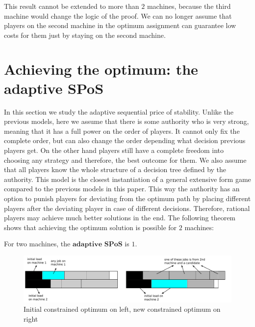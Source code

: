 \documentclass[runningheads]{llncs}
\newcommand{\aSPoS}{\textbf{adaptive SPoS}\xspace}
\begin{document}
\begin{remark} 
This result cannot be extended to more than $2$ machines, because the third machine would change the logic of the proof. We can no longer assume that players on the second machine in the optimum assignment can guarantee low costs for them just by staying on the second machine.
\end{remark}

\section{Achieving the optimum: the \aSPoS}
\label{sec:optimum_sequence}

In this section we study the adaptive sequential price of stability. Unlike the previous models, here we assume that there is some authority who is very strong, meaning that it has a full power on the order of players. It cannot only fix the complete order, but can also change the order depending what decision previous players get. On the other hand players still have a complete freedom into choosing any strategy and therefore, the best outcome for them. We also assume that all players know the whole structure of a decision tree defined by the authority. This model is the closest instantiation of a general extensive form game compared to the previous models in this paper. This way the authority has an option to punish players for deviating from the optimum path by placing different players after the deviating player in case of different decisions. Therefore, rational players may achieve much better solutions in the end. The following theorem shows that achieving the optimum solution is possible for $2$ machines:




\begin{theorem}\label{optimum_sequence}
For two machines, the $\aSPoS$ is $1$.
\end{theorem}

\begin{figure}
	\centering
	\includegraphics[scale=.65]{find_next_player}
	\caption{Initial constrained optimum on left, new constrained optimum on right}
	\label{fig:next_player}
\end{figure}
\end{document}
